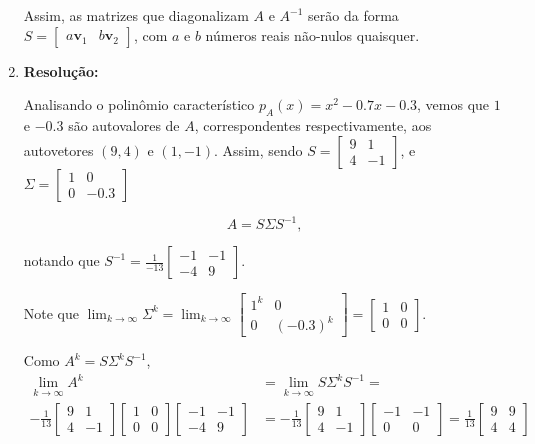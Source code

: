 \documentclass[leqno]{article}
\begin{document}
\begin{enumerate}
    Assim, as matrizes que diagonalizam $A$ e $A^{-1}$ serão da forma $S=\begin{bmatrix}a\textbf{v}_1 & b\textbf{v}_2\end{bmatrix}$, com $a$ e $b$ números reais não-nulos quaisquer.
    
    \item 
    
    \textbf{Resolução:}
    
    Analisando o polinômio característico $p_A(x)=x^2-0.7x-0.3$, vemos que $1$ e $-0.3$ são autovalores de $A$, correspondentes respectivamente, aos autovetores $(9,4)$ e $(1,-1)$. Assim, sendo $S=\begin{bmatrix}9 & 1\\
    4 & -1\end{bmatrix}$, e $\Sigma=\begin{bmatrix}1 & 0\\
    0 & -0.3\end{bmatrix}$
    
    $$A=S\Sigma S^{-1}\text{,}$$
    
    notando que $S^{-1}=\frac{1}{-13}\begin{bmatrix}-1 & -1\\-4 & 9\end{bmatrix}$.
    
    Note que $\lim_{k\to\infty} \Sigma^k=\lim_{k\to\infty} \begin{bmatrix}1^k & 0\\0 & (-0.3)^k\end{bmatrix}=\begin{bmatrix}1 & 0\\0 & 0\end{bmatrix}$.
    
    Como $A^k=S\Sigma^kS^{-1}$, \begin{align*}
        \lim_{k\to\infty} A^k&=\lim_{k\to\infty} S\Sigma^k S^{-1}=\\-\frac{1}{13}\begin{bmatrix}9 & 1\\
    4 & -1\end{bmatrix}\begin{bmatrix}1 & 0\\0 & 0\end{bmatrix}\begin{bmatrix}-1 & -1\\
    -4 & 9\end{bmatrix}&=-\frac{1}{13}\begin{bmatrix}9 & 1\\4 & -1\end{bmatrix}\begin{bmatrix}-1 & -1\\0 & 0\end{bmatrix}=\frac{1}{13}\begin{bmatrix}9 & 9\\ 4 & 4\end{bmatrix}
    \end{align*}
    

\end{enumerate}
\end{document}
